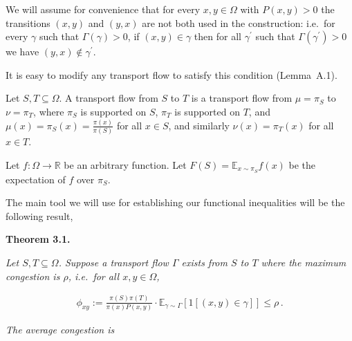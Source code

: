 \documentclass[10pt,a4paper]{article}
\begin{document}
We will assume for convenience that for every $x,y\in\Omega$ with $P(x,y)>0$ the transitions $(x,y)$ and $(y,x)$ are not both used in the construction: i.e. for every $\gamma$ such that $\Gamma(\gamma)>0$, if $(x,y)\in\gamma$ then for all $\gamma^{\prime}$ such that $\Gamma(\gamma^{\prime})>0$ we have $(y,x)\notin\gamma^{\prime}$.\par




It is easy to modify any transport flow to satisfy this condition (Lemma A.1).\par




Let $S,T\subseteq\Omega$. A transport flow from $S$ to $T$ is a transport flow from $\mu=\pi_{S}$ to $\nu=\pi_{T}$, where $\pi_{S}$ is supported on $S$, $\pi_{T}$ is supported on $T$, and $\mu(x)=\pi_{S}(x)=\frac{\pi(x)}{\pi(S)}$ for all $x\in S$, and similarly $\nu(x)=\pi_{T}(x)$ for all $x\in T$.\par




Let $f:\Omega\rightarrow\mathbb{R}$ be an arbitrary function. Let $F(S)=\mathbb{E}_{x\sim\pi_{S}}f(x)$ be the expectation of $f$ over $\pi_{S}$.\par




The main tool we will use for establishing our functional inequalities will be the following result,\par





\par\medskip\noindent\textbf{\textbf{Theorem 3.1}\textbf{.}}\par



\emph{Let $S,T\subseteq\Omega$. Suppose a transport flow $\Gamma$ exists from $S$ to $T$ where the maximum congestion is $\rho$, i.e. for all $x,y\in\Omega$,}\par




\[\begin{gathered}
\phi_{xy}:=\frac{\pi(S)\pi(T)}{\pi(x)P(x,y)}\cdot\mathbb{E}_{\gamma\sim\Gamma}\left[1[(x,y)\in\gamma]\right]\leq\rho\,.
\end{gathered}\]




\emph{The average congestion is}\par
\end{document}
